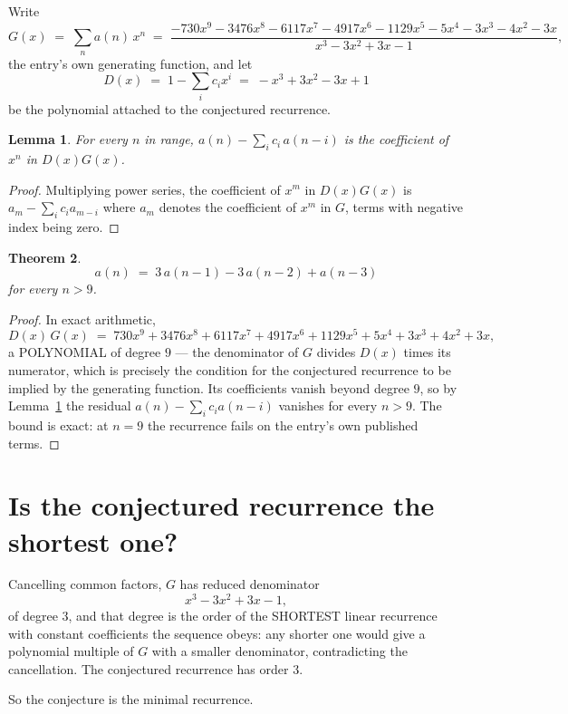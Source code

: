 \documentclass[11pt,a4paper]{article}
\theoremstyle{plain}
\newtheorem{theorem}{Theorem}
\newtheorem{lemma}[theorem]{Lemma}
\theoremstyle{definition}
\begin{document}
Write
\[
G(x)\;=\;\sum_{n}a(n)\,x^{n}\;=\;\frac{- 730 x^{9} - 3476 x^{8} - 6117 x^{7} - 4917 x^{6} - 1129 x^{5} - 5 x^{4} - 3 x^{3} - 4 x^{2} - 3 x}{x^{3} - 3 x^{2} + 3 x - 1},
\]
the entry's own generating function, and let
\[
D(x)\;=\;1-\sum_i c_i x^{i}\;=\;- x^{3} + 3 x^{2} - 3 x + 1
\]
be the polynomial attached to the conjectured recurrence.

\begin{lemma}\label{lem:key}
For every $n$ in range, $a(n)-\sum_i c_i\,a(n-i)$ is the coefficient of $x^{n}$ in
$D(x)G(x)$.
\end{lemma}

\begin{proof}
Multiplying power series, the coefficient of $x^{m}$ in $D(x)G(x)$ is
$a_m-\sum_i c_i a_{m-i}$ where $a_m$ denotes the coefficient of $x^{m}$ in $G$, terms with
negative index being zero.
\end{proof}

\begin{theorem}
\[
a(n)\;=\;3\,a(n-1) - 3\,a(n-2) + a(n-3)
\]
for every $n>9$.
\end{theorem}

\begin{proof}
In exact arithmetic,
\[
D(x)\,G(x)\;=\;730 x^{9} + 3476 x^{8} + 6117 x^{7} + 4917 x^{6} + 1129 x^{5} + 5 x^{4} + 3 x^{3} + 4 x^{2} + 3 x,
\]
a POLYNOMIAL of degree $9$ --- the denominator of $G$ divides $D(x)$ times its numerator,
which is precisely the condition for the conjectured recurrence to be implied by the
generating function. Its coefficients vanish beyond degree $9$, so by
Lemma~\ref{lem:key} the residual $a(n)-\sum_ic_ia(n-i)$ vanishes for every
$n>9$. The bound is exact: at $n=9$ the recurrence fails on the entry's own published terms.
\end{proof}

\section{Is the conjectured recurrence the shortest one?}

Cancelling common factors, $G$ has reduced denominator
\[
x^{3} - 3 x^{2} + 3 x - 1,
\]
of degree $3$, and that degree is the order of the SHORTEST linear recurrence with
constant coefficients the sequence obeys: any shorter one would give a polynomial multiple of
$G$ with a smaller denominator, contradicting the cancellation. The conjectured recurrence has
order $3$.

So the conjecture is the minimal recurrence.
\end{document}
